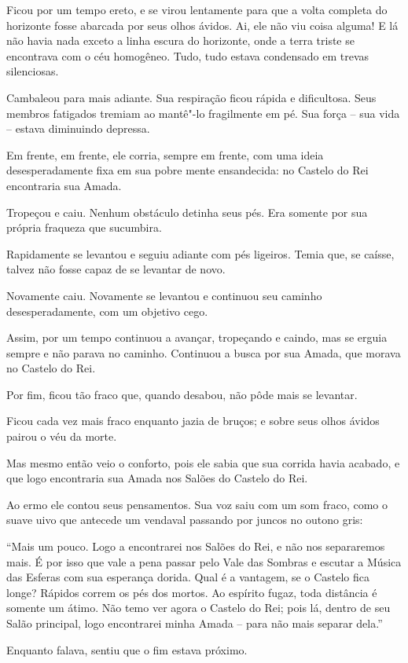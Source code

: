 Ficou por um tempo ereto, e se virou lentamente para que a volta
completa do horizonte fosse abarcada por seus olhos ávidos. Ai, ele não
viu coisa alguma! E lá não havia nada exceto a linha escura do
horizonte, onde a terra triste se encontrava com o céu homogêneo. Tudo,
tudo estava condensado em trevas silenciosas.

Cambaleou para mais adiante. Sua respiração ficou rápida e dificultosa.
Seus membros fatigados tremiam ao mantê"-lo fragilmente em pé. Sua força
-- sua vida -- estava diminuindo depressa.

Em frente, em frente, ele corria, sempre em frente, com uma ideia
desesperadamente fixa em sua pobre mente ensandecida: no Castelo do Rei
encontraria sua Amada.

Tropeçou e caiu. Nenhum obstáculo detinha seus pés. Era somente por sua
própria fraqueza que sucumbira.

Rapidamente se levantou e seguiu adiante com pés ligeiros. Temia que, se
caísse, talvez não fosse capaz de se levantar de novo.

Novamente caiu. Novamente se levantou e continuou seu caminho
desesperadamente, com um objetivo cego.

Assim, por um tempo continuou a avançar, tropeçando e caindo, mas se
erguia sempre e não parava no caminho. Continuou a busca por sua
Amada, que morava no Castelo do Rei.

Por fim, ficou tão fraco que, quando desabou, não pôde mais se levantar.

Ficou cada vez mais fraco enquanto jazia de bruços; e sobre seus olhos
ávidos pairou o véu da morte.

Mas mesmo então veio o conforto, pois ele sabia que sua corrida havia
acabado, e que logo encontraria sua Amada nos Salões do Castelo do
Rei.

Ao ermo ele contou seus pensamentos. Sua voz saiu com um som fraco, como
o suave uivo que antecede um vendaval passando por juncos no outono
gris:

``Mais um pouco. Logo a encontrarei nos Salões do Rei, e não nos
separaremos mais. É por isso que vale a pena passar pelo Vale das
Sombras e escutar a Música das Esferas com sua esperança dorida. Qual é
a vantagem, se o Castelo fica longe? Rápidos correm os pés dos mortos.
Ao espírito fugaz, toda distância é somente um átimo. Não temo ver agora
o Castelo do Rei; pois lá, dentro de seu Salão principal, logo
encontrarei minha Amada -- para não mais separar dela.''

Enquanto falava, sentiu que o fim estava próximo.

